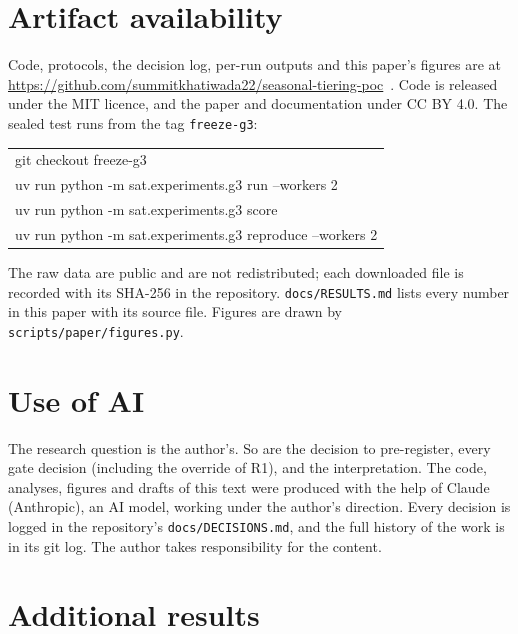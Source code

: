 \documentclass[11pt]{article}
\begin{document}
\section*{Artifact availability}

Code, protocols, the decision log, per-run outputs and this paper's figures are at \url{https://github.com/summitkhatiwada22/seasonal-tiering-poc}~\cite{repo}. Code is released under the MIT licence, and the paper and documentation under CC BY 4.0. The sealed test runs from the tag \texttt{freeze-g3}:
\begin{center}
\small\ttfamily
\begin{tabular}{l}
git checkout freeze-g3 \\
uv run python -m sat.experiments.g3 run --workers 2 \\
uv run python -m sat.experiments.g3 score \\
uv run python -m sat.experiments.g3 reproduce --workers 2 \\
\end{tabular}
\end{center}
The raw data are public and are not redistributed; each downloaded file is recorded with its SHA-256 in the repository. \texttt{docs/RESULTS.md} lists every number in this paper with its source file. Figures are drawn by \texttt{scripts/paper/figures.py}.

\section*{Use of AI}

The research question is the author's. So are the decision to pre-register, every gate decision (including the override of R1), and the interpretation. The code, analyses, figures and drafts of this text were produced with the help of Claude (Anthropic), an AI model, working under the author's direction. Every decision is logged in the repository's \texttt{docs/DECISIONS.md}, and the full history of the work is in its git log. The author takes responsibility for the content.


\setlength{\bibsep}{2pt}
{\small}

\appendix
\section{Additional results}
\end{document}
